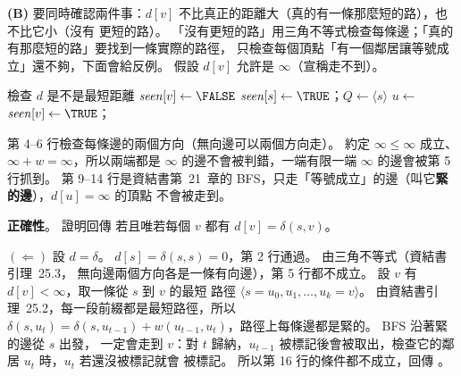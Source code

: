\begin{pastsoln}
\textbf{(B)} 要同時確認兩件事：$d[v]$ 不比真正的距離大（真的有一條那麼短的路），也不比它小（沒有
更短的路）。 「沒有更短的路」用三角不等式檢查每條邊；「真的有那麼短的路」要找到一條實際的路徑，
只檢查每個頂點「有一個鄰居讓等號成立」還不夠，下面會給反例。 假設 $d[v]$ 允許是 $\infty$（宣稱走不到）。

\begin{pseudo}{檢查 $d$ 是不是最短距離}
        \State \Return \FALSE
    \EndIf
            \State \Return \FALSE {}
        \EndIf
    \EndFor
        \State $\mathit{seen}[v] \gets \FALSE$
    \EndFor
    \State $\mathit{seen}[s] \gets \TRUE$；$Q \gets \langle s \rangle$
        \State $u \gets$ 
                \State $\mathit{seen}[v] \gets \TRUE$；
            \EndIf
        \EndFor
    \EndWhile
            \State \Return \FALSE {}
        \EndIf
    \EndFor
    \State \Return \TRUE
\EndFunction
\end{pseudo}

第 4--6 行檢查每條邊的兩個方向（無向邊可以兩個方向走）。 約定 $\infty \le \infty$ 成立、
$\infty + w = \infty$，所以兩端都是 $\infty$ 的邊不會被判錯，一端有限一端 $\infty$ 的邊會被第 5 行抓到。
第 9--14 行是資結書第~21~章的 BFS，只走「等號成立」的邊（叫它\textbf{緊的邊}），$d[u] = \infty$ 的頂點
不會被走到。

\textbf{正確性}。 證明回傳 \TRUE 若且唯若每個 $v$ 都有 $d[v] = \delta(s, v)$。

$(\Leftarrow)$ 設 $d = \delta$。 $d[s] = \delta(s, s) = 0$，第 2 行通過。 由三角不等式（資結書引理~25.3，
無向邊兩個方向各是一條有向邊），第 5 行都不成立。 設 $v$ 有 $d[v] < \infty$，取一條從 $s$ 到 $v$ 的最短
路徑 $\langle s = u_0, u_1, \ldots, u_k = v \rangle$。 由資結書引理~25.2，每一段前綴都是最短路徑，所以
$\delta(s, u_t) = \delta(s, u_{t-1}) + w(u_{t-1}, u_t)$，路徑上每條邊都是緊的。 BFS 沿著緊的邊從 $s$ 出發，
一定會走到 $v$：對 $t$ 歸納，$u_{t-1}$ 被標記後會被取出，檢查它的鄰居 $u_t$ 時，$u_t$ 若還沒被標記就會
被標記。 所以第 16 行的條件都不成立，回傳 \TRUE。


\end{pastsoln}
